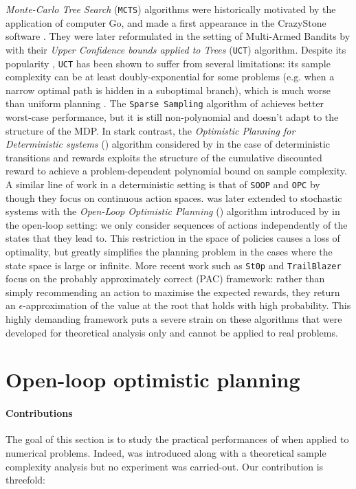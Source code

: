 \emph{Monte-Carlo Tree Search} (\texttt{MCTS}) algorithms were historically motivated by the application of computer Go, and made a first appearance in the CrazyStone software \citet{Coulom2006}. They were later reformulated in the setting of Multi-Armed Bandits by \citet{Kocsis2006} with their \emph{Upper Confidence bounds applied to Trees} (\texttt{UCT}) algorithm. Despite its popularity \citep{Silver2016,Silver2017,Silver2018}, \texttt{UCT} has been shown to suffer from several limitations: its sample complexity can be at least doubly-exponential for some problems (e.g. when a narrow optimal path is hidden in a suboptimal branch), which is much worse than uniform planning \citep{Coquelin2007}. The \texttt{Sparse Sampling} algorithm of \citet{Kearns2002} achieves better worst-case performance, but it is still non-polynomial and doesn't adapt to the structure of the MDP. In stark contrast, the \emph{Optimistic Planning for Deterministic systems} (\OPD) algorithm considered by \citet{Hren2008} in the case of deterministic transitions and rewards exploits the structure of the cumulative discounted reward to achieve a problem-dependent polynomial bound on sample complexity. A similar line of work in a deterministic setting is that of \texttt{SOOP} and \texttt{OPC} by \citep{Busoniu2013,Busoniu2018} though they focus on continuous action spaces. \OPD was later extended to stochastic systems with the \emph{Open-Loop Optimistic Planning} (\OLOP) algorithm introduced by \citet{Bubeck2010} in the open-loop setting: we only consider sequences of actions independently of the states that they lead to. This restriction in the space of policies causes a loss of optimality, but greatly simplifies the planning problem in the cases where the state space is large or infinite. More recent work such as \texttt{St0p} \citep{Szorenyi2014} and \texttt{TrailBlazer} \citep{Grill2016} focus on the probably approximately correct (PAC) framework: rather than simply recommending an action to maximise the expected rewards, they return an $\epsilon$-approximation of the value at the root that holds with high probability. This highly demanding framework puts a severe strain on these algorithms that were developed for theoretical analysis only and cannot be applied to real problems.

\section{Open-loop optimistic planning}

\paragraph{Contributions} The goal of this section is to study the practical performances of \OLOP when applied to numerical problems. Indeed, \OLOP was introduced along with a theoretical sample complexity analysis but no experiment was carried-out. Our contribution is threefold:

